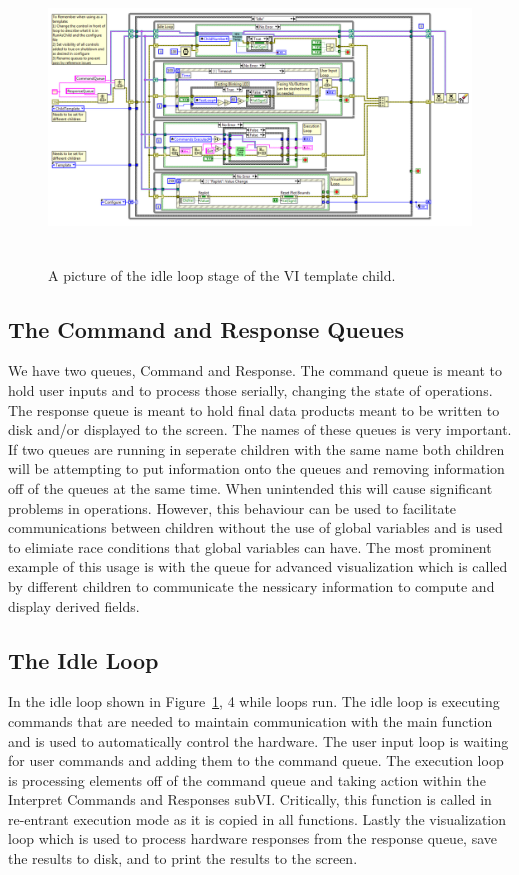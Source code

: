 \begin{figure}[!h]\centering
\includegraphics[height=3in]{Figures/MainVITemplateBackPanel}
\caption{A picture of the idle loop stage of the VI template child.}
\label{Fig:VITemplateBP}
\end{figure}

\subsection{The Command and Response Queues}

We have two queues, Command and Response. The command queue is meant to hold user inputs and to process those serially, changing the state of operations. The response queue is meant to hold final data products meant to be written to disk and/or displayed to the screen. The names of these queues is very important. If two queues are running in seperate children with the same name both children will be attempting to put information onto the queues and removing information off of the queues at the same time. When unintended this will cause significant problems in operations. However, this behaviour can be used to facilitate communications between children without the use of global variables and is used to elimiate race conditions that global variables can have. The most prominent example of this usage is with the queue for advanced visualization which is called by different children to communicate the nessicary information to compute and display derived fields.  

\subsection{The Idle Loop}

In the idle loop shown in Figure~\ref{Fig:VITemplateBP}, 4 while loops run. The idle loop is executing commands that are needed to maintain communication with the main function and is used to automatically control the hardware. The user input loop is waiting for user commands and adding them to the command queue. The execution loop is processing elements off of the command queue and taking action within the Interpret Commands and Responses subVI. Critically, this function is called in re-entrant execution mode as it is copied in all functions. Lastly the visualization loop which is used to process hardware responses from the response queue, save the results to disk, and to print the results to the screen. 

